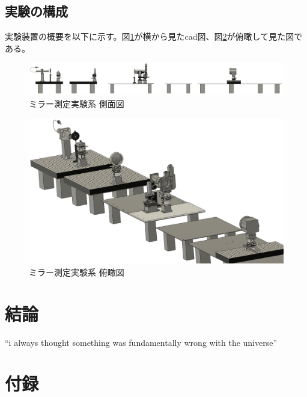 \documentclass[dvipdfmx,autodetect-engine]{jreport}
\begin{document}
\newpage
\section{実験の構成}
実験装置の概要を以下に示す。図\ref{fig:mirror_experiment_asm_cad_side}が横から見たcad図、図\ref{fig:mirror_experiment_asm_cad_isometric}が俯瞰して見た図である。

\begin{figure}[h!]
\centering
\includegraphics[scale=0.25]{images/mirror_experiment/setup/asm_total_side.png}
\caption{ミラー測定実験系 側面図}
\label{fig:mirror_experiment_asm_cad_side}
\end{figure}

\begin{figure}[h!]
\centering
\includegraphics[scale=0.25]{images/mirror_experiment/setup/asm_total_isometric.png}
\caption{ミラー測定実験系 俯瞰図}
\label{fig:mirror_experiment_asm_cad_isometric}
\end{figure}

\newpage
\chapter{結論}
\minitoc

\newpage
``i always thought something was fundamentally wrong with the universe'' \citep{adams1995hitchhiker}


\newpage
\chapter{付録}
\minitoc
\end{document}

